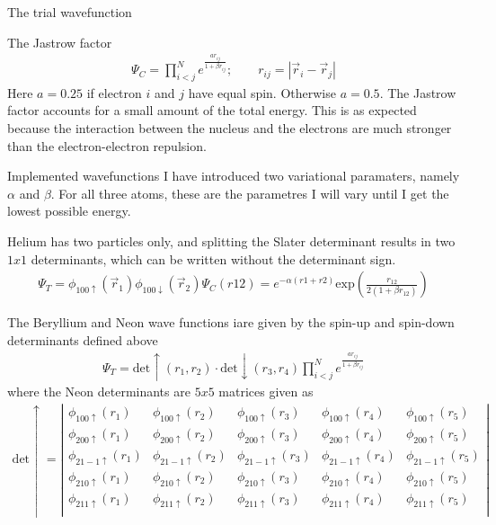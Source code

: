 \documentclass[a4paper, 12pt, titlepage]{article}
\begin{document}
\begin{section}{The trial wavefunction}
\begin{subsection}{The Jastrow factor}
  \begin{align}
  	\Psi_C = \prod_{i<j}^N e^{\frac{ar_{ij}}{1+\beta r_{ij}}}; \quad \quad r_{ij} = \left| \vec r_i - \vec r_j \right| 
  \end{align}
  Here $a=0.25$ if electron $i$ and $j$ have equal spin. Otherwise $a =0.5$. The Jastrow factor accounts for a small amount of the total energy. This is as expected because the interaction between the nucleus and the electrons are much stronger than the electron-electron repulsion. 
 \end{subsection}
 \begin{subsection}{Implemented wavefunctions}
  I have introduced two variational paramaters, namely $\alpha$ and $\beta$. For all three atoms, these are the parametres I will vary until I get the lowest possible energy. \par 
  Helium has two particles only, and splitting the Slater determinant results in two $1x1$ determinants, which can be written without the determinant sign. 
  \begin{align}
  	\Psi_T = \phi_{100 \uparrow}(\vec r_1) \phi_{100 \downarrow}(\vec r_2) \Psi_C(r12) = e^{-\alpha (r1+r2)} \text{exp}(\frac{r_{12}}{2(1+\beta r_{12})})
  \end{align}

  The Beryllium and Neon wave functions iare given by the spin-up and spin-down determinants defined above
  \begin{align}
  	\Psi_T = \text{det}\uparrow(r_1,r_2) \cdot \text{det}\downarrow(r_3,r_4) \prod_{i<j}^N e^{\frac{ar_{ij}}{1+\beta r_{ij}}}
  \end{align}
  where the Neon determinants are $5x5$ matrices given as
  \begin{align}
  	\text{det}\uparrow = \left| \begin{matrix}
	 	\phi_{100 \uparrow} (r_1)  &  \phi_{100 \uparrow} (r_2)  & \phi_{100 \uparrow} (r_3) &  \phi_{100 \uparrow} (r_4) & \phi_{100 \uparrow} (r_5) \\
		\phi_{200 \uparrow} (r_1)  &  \phi_{200 \uparrow} (r_2)  & \phi_{200 \uparrow} (r_3) &  \phi_{200 \uparrow} (r_4) & \phi_{200 \uparrow} (r_5) \\
		\phi_{21-1 \uparrow} (r_1)  &  \phi_{21-1 \uparrow} (r_2)  & \phi_{21-1 \uparrow} (r_3) &  \phi_{21-1 \uparrow} (r_4) & \phi_{21-1 \uparrow} (r_5) \\
		\phi_{210 \uparrow} (r_1)  &  \phi_{210 \uparrow} (r_2)  & \phi_{210 \uparrow} (r_3) &  \phi_{210 \uparrow} (r_4) & \phi_{210 \uparrow} (r_5) \\
		\phi_{211 \uparrow} (r_1)  &  \phi_{211 \uparrow} (r_2)  & \phi_{211 \uparrow} (r_3) &  \phi_{211 \uparrow} (r_4) & \phi_{211 \uparrow} (r_5) \\			
           	     \end{matrix} \right|
  \end{align}
 \end{subsection}


\end{section}
\end{document}
